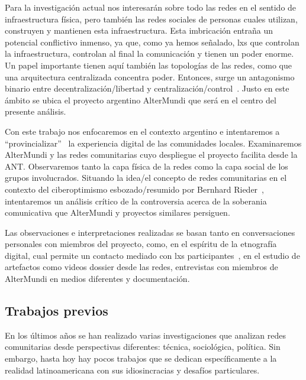 Para la investigación actual nos interesarán sobre todo las redes en el sentido de infraestructura física, pero también las redes sociales de personas cuales utilizan, construyen y mantienen esta infraestructura.
Esta imbricación entraña un potencial conflictivo inmenso, ya que, como ya hemos señalado, lxs que controlan la infraestructura, controlan al final la comunicación y tienen un poder enorme.
Un papel importante tienen aquí también las topologías de las redes, como que una arquitectura centralizada concentra poder.
Entonces, surge un antagonismo binario entre decentralización/libertad y centralización/control~\autocite{FiTre2015}.
Justo en este ámbito se ubica el proyecto argentino AlterMundi que será en el centro del presente análisis.

Con este trabajo nos enfocaremos en el contexto argentino e intentaremos a ``provincializar''~\autocite{Coleman2010} la experiencia digital de las comunidades locales.
Examinaremos AlterMundi y las redes comunitarias cuyo despliegue el proyecto facilita desde la ANT.
Observaremos tanto la capa física de la redes como la capa social de los grupos involucrados.
Situando la idea/el concepto de redes comunitarias en el contexto del ciberoptimismo esbozado/resumido por Bernhard Rieder~\autocite{Rieder2012}, intentaremos un análisis crítico de la controversia acerca de la soberania comunicativa que AlterMundi y proyectos similares persiguen.

Las observaciones e interpretaciones realizadas se basan tanto en conversaciones personales con miembros del proyecto, como, en el espíritu de la etnografía digital, cual permite un contacto mediado con lxs participantes~\autocite{PHPHLT2016}, en el estudio de artefactos como videos dossier desde las redes, entrevistas con miembros de AlterMundi en medios diferentes y documentación.

\subsection{Trabajos previos}

En los últimos años se han realizado varias investigaciones que analizan redes comunitarias desde perspectivas diferentes: técnica, sociológica, política.
Sin embargo, hasta hoy hay pocos trabajos que se dedican específicamente a la realidad latinoamericana con sus idiosincracias y desafíos particulares.

